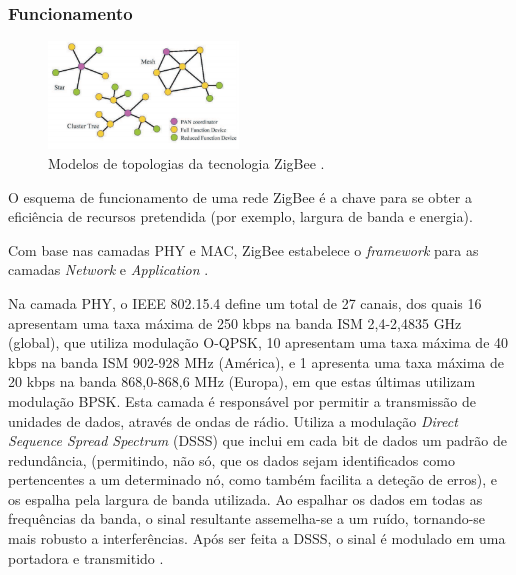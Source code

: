 \documentclass[conference]{IEEEtran}
\begin{document}
\subsubsection{Funcionamento}

\begin{figure}[!t]
  \centering
  \includegraphics[width=0.45\textwidth]{Modelos_Topologias_ZigBee.png}
  \caption{Modelos de topologias da tecnologia ZigBee \cite{sinem2004zigbee}.}
  \label{fig:topZigBee}
\end{figure}

O esquema de funcionamento de uma rede ZigBee é a chave para se obter a eficiência de recursos pretendida (por exemplo, largura de banda e energia).

Com base nas camadas PHY e MAC, ZigBee estabelece o \textit{framework} para as camadas \textit{Network} e \textit{Application} \cite{liang2006impact}.

Na camada PHY, o IEEE 802.15.4 define um total de 27 canais, dos quais 16 apresentam uma taxa máxima de 250 kbps na banda ISM 2,4-2,4835 GHz (global), que utiliza modulação O-QPSK, 10 apresentam uma taxa máxima de 40 kbps na banda ISM 902-928 MHz (América), e 1 apresenta uma taxa máxima de 20 kbps na banda 868,0-868,6 MHz (Europa), em que estas últimas utilizam modulação BPSK.
Esta camada é responsável por permitir a transmissão de unidades de dados, através de ondas de rádio.
Utiliza a modulação \textit{Direct Sequence Spread Spectrum} (DSSS) que inclui em cada bit de dados um padrão de redundância, (permitindo, não só, que os dados sejam identificados como pertencentes a um determinado nó, como também facilita a deteção de erros), e os espalha pela largura de banda utilizada.
Ao espalhar os dados em todas as frequências da banda, o sinal resultante assemelha-se a um ruído, tornando-se mais robusto a interferências. 
Após ser feita a DSSS, o sinal é modulado em uma portadora e transmitido \cite{liang2006impact}.
\end{document}
